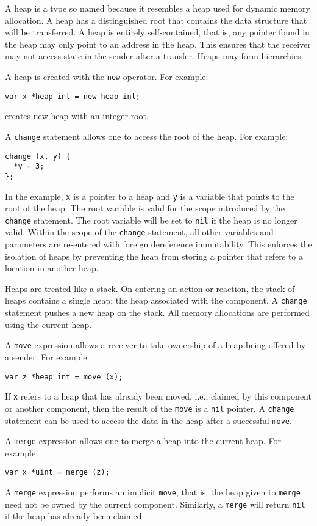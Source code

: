 A heap is a type so named because it resembles a heap used for dynamic memory allocation.
A heap has a distinguished root that contains the data structure that will be transferred.
A heap is entirely self-contained, that is, any pointer found in the heap may only point to an address in the heap.
This ensures that the receiver may not access state in the sender after a transfer.
Heaps may form hierarchies.

A heap is created with the \verb+new+ operator.
For example:
\begin{verbatim}
var x *heap int = new heap int;
\end{verbatim}
creates new heap with an integer root.

A \verb+change+ statement allows one to access the root of the heap.
For example:
\begin{verbatim}
change (x, y) {
  *y = 3;
};
\end{verbatim}
In the example, \verb+x+ is a pointer to a heap and \verb+y+ is a variable that points to the root of the heap.
The root variable is valid for the scope introduced by the \verb+change+ statement.
The root variable will be set to \verb+nil+ if the heap is no longer valid.
Within the scope of the \verb+change+ statement, all other variables and parameters are re-entered with foreign dereference immutability.
This enforces the isolation of heaps by preventing the heap from storing a pointer that refers to a location in another heap.

Heaps are treated like a stack.
On entering an action or reaction, the stack of heaps contains a single heap:  the heap associated with the component.
A \verb+change+ statement pushes a new heap on the stack.
All memory allocations are performed using the current heap.

A \verb+move+ expression allows a receiver to take ownership of a heap being offered by a sender.
For example:
\begin{verbatim}
var z *heap int = move (x);
\end{verbatim}
If \verb+x+ refers to a heap that has already been moved, i.e., claimed by this component or another component, then the result of the \verb+move+ is a \verb+nil+ pointer.
A \verb+change+ statement can be used to access the data in the heap after a successful \verb+move+.

A \verb+merge+ expression allows one to merge a heap into the current heap.
For example:
\begin{verbatim}
var x *uint = merge (z);
\end{verbatim}
A \verb+merge+ expression performs an implicit \verb+move+, that is, the heap given to \verb+merge+ need not be owned by the current component.
Similarly, a \verb+merge+ will return \verb+nil+ if the heap has already been claimed.

